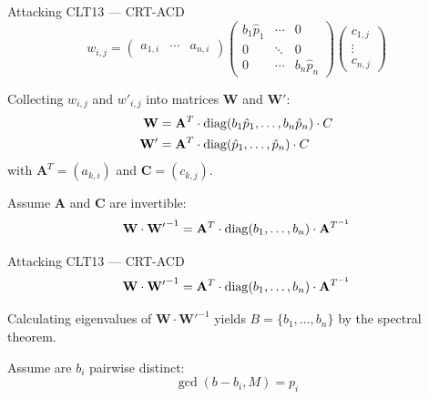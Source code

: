 \documentclass[english]{beamer}
\begin{document}
    \begin{frame}{Attacking CLT13 --- CRT-ACD}
        \begin{equation*}
            w_{i,j} =
            \begin{pmatrix}
                a_{1, i} & \cdots & a_{n, i}
            \end{pmatrix}
            \begin{pmatrix}
                b_1 \hat{p}_1 & \cdots & 0 \\
                0 & \ddots & 0 \\
                0 & \cdots & b_n \hat{p}_n
            \end{pmatrix}
            \begin{pmatrix}
                c_{1, j} \\
                \vdots \\
                c_{n, j}
            \end{pmatrix}
        \end{equation*}

        Collecting $w_{i,j}$ and $w'_{i,j}$ into matrices $\mathbf{W}$ and $\mathbf{W'}$:
        \begin{align*}
            \mathbf{W} &= \mathbf{A}^T \cdot \operatorname{diag}(b_1 \hat{p}_1, \dots, b_n \hat{p}_n) \cdot C \\
            \mathbf{W'} &= \mathbf{A}^T \cdot \operatorname{diag}(\hat{p}_1, \dots, \hat{p}_n) \cdot C
        \end{align*}
        with $\mathbf{A}^T = (a_{k,i})$ and $\mathbf{C} = (c_{k,j})$.

        \pause
        Assume $\mathbf{A}$ and $\mathbf{C}$ are invertible:
        \begin{equation*}
            \mathbf{W} \cdot \mathbf{W'}^{-1} = \mathbf{A}^T \cdot \operatorname{diag}(b_1, \dots, b_n) \cdot \mathbf{A}^{T^{-1}}
        \end{equation*}
    \end{frame}
    \begin{frame}{Attacking CLT13 --- CRT-ACD}
        \begin{equation*}
            \mathbf{W} \cdot \mathbf{W'}^{-1} = \mathbf{A}^T \cdot \operatorname{diag}(b_1, \dots, b_n) \cdot \mathbf{A}^{T^{-1}}
        \end{equation*}

        Calculating eigenvalues of $\mathbf{W} \cdot \mathbf{W'}^{-1}$ yields $B = \{b_1, \dots, b_n\}$ by the spectral theorem.

        \pause
        Assume are $b_i$ pairwise distinct:
        \begin{equation*}
            \gcd(b - b_i, M) = p_i
        \end{equation*}
    \end{frame}
\end{document}
